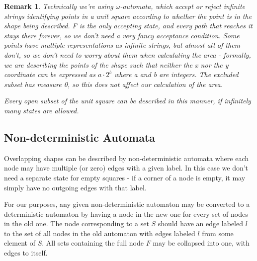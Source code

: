 \documentclass{article}
\newtheorem*{remark}{Remark}
\begin{document}
\begin{remark}
	Technically we're using $\omega$-automata, which accept or reject infinite strings identifying points in a unit square according to whether the point is in the shape being described.
	F is the only accepting state, and every path that reaches it stays there forever, so we don't need a very fancy acceptance condition.
	Some points have multiple representations as infinite strings, but almost all of them don't, so we don't need to worry about them when calculating the area - formally, we are describing the points of the shape such that neither the x nor the y coordinate can be expressed as $a \cdotp 2^b$ where a and b are integers. The excluded subset has measure 0, so this does not affect our calculation of the area.
	
	Every open subset of the unit square can be described in this manner, if infinitely many states are allowed.
\end{remark}

\subsection{Non-deterministic Automata}
Overlapping shapes can be described by non-deterministic automata where each node may have multiple (or zero) edges with a given label. In this case we don't need a separate state for empty squares - if a corner of a node is empty, it may simply have no outgoing edges with that label.

For our purposes, any given non-deterministic automaton may be converted to a deterministic automaton by having a node in the new one for every set of nodes in the old one. The node corresponding to a set $S$ should have an edge labeled $l$ to the set of all nodes in the old automaton with edges labeled $l$ from some element of $S$. All sets containing the full node $F$ may be collapsed into one, with edges to itself.
\end{document}
